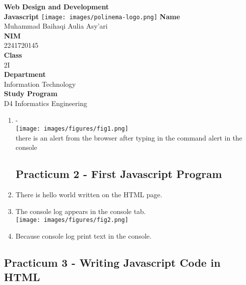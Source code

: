 \documentclass[12pt,titlepage]{article}
\newcommand{\vSubject}{Web Design and Development}
\newcommand{\vSubtitle}{Javascript}
\newcommand{\vName}{Muhammad Baihaqi Aulia Asy'ari}
\newcommand{\vNIM}{2241720145}
\newcommand{\vClass}{2I}
\newcommand{\vDepartment}{Information Technology}
\newcommand{\vStudyProgram}{D4 Informatics Engineering}
\begin{document}
\begin{titlepage}
    \centering
    \vfill
    {\bfseries\LARGE
        \vSubject\\
        \vskip0.25cm
        \vSubtitle
    }
    \vfill
    \texttt{[image: images/polinema-logo.png]}
    \vfill
    {
        \textbf{Name}\\
        \vName\\
        \vskip0.5cm
        \textbf{NIM}\\
        \vNIM\\
        \vskip0.5cm
        \textbf{Class}\\
        \vClass\\
        \vskip0.5cm
        \textbf{Department}\\
        \vDepartment\\
        \vskip0.5cm
        \textbf{Study Program}\\
        \vStudyProgram
    }
\end{titlepage}

\newpage

\begin{enumerate}
    \subsection*{Practicum 1 - Intro}
    \item - \\ \texttt{[image: images/figures/fig1.png]} \\ there is an alert from the browser after typing in the command alert in the console
    \subsection*{Practicum 2 - First Javascript Program}
    \item There is hello world written on the HTML page.
    \item The console log appears in the console tab. \\ \texttt{[image: images/figures/fig2.png]}
    \item Because console log print text in the console. 
\end{enumerate}

\subsection*{Practicum 3 - Writing Javascript Code in HTML}
\end{document}

